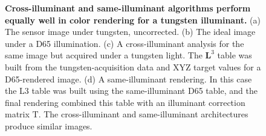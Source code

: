 \documentclass[]{spie}
\newcommand{\Lcube}{\boldsymbol L^3}
\newcommand{\SIDT}{\mathrm{SI_{D65}-T}}
\newcommand{\TT}{\mathrm{T}}
\begin{document}
\begin{figure}[t]
\begin{center}
\begin{minipage}[b]{0.245\textwidth}
 \centering\small\text{(d) $\SIDT$}
\end{minipage}
\end{center}
\caption{\textbf{Cross-illuminant and same-illuminant algorithms perform equally well in color rendering for a tungsten illuminant.} (a) The sensor image under tungsten, uncorrected. (b) The ideal image under a D65 illumination. (c) A cross-illuminant analysis for the same image but acquired under a tungsten light. The $\Lcube$ table was built from the tungsten-acquisition data and XYZ target values for a D65-rendered image. (d) A same-illuminant rendering. In this case the L3 table was built using the same-illuminant D65 table, and the final rendering combined this table with an illuminant correction matrix $\TT$. The cross-illuminant and same-illuminant architectures produce similar images.}
\label{fig:examplestungsten}
\end{figure}
\end{document}

